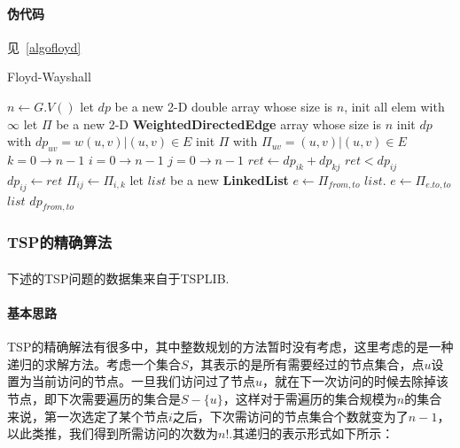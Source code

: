 \documentclass[UTF8,a4paper]{ctexart}
\begin{document}
\paragraph{伪代码}见~\ref{algofloyd}
\begin{algorithm}[htbp]
    \caption{Floyd-Wayshall}\label{algofloyd}
    \begin{algorithmic}[1] %
        \State $n\gets G.V()$
        \State let $dp$ be a new 2-D double array whose size is $n$, init all elem with $\infty$
        \State let $\Pi$ be a new 2-D \textbf{WeightedDirectedEdge} array whose size is $n$
        \State init $dp$ with $dp_{uv} = w(u,v)|(u,v)\in E$
        \State init $\Pi$ with $\Pi_{uv} = (u,v)|(u,v)\in E$
        \For $k=0\to n-1$
        \For $i=0\to n-1$
        \For $j=0\to n-1$
        \State $ret\gets dp_{ik}+dp_{kj}$
        \If $ret < dp_{ij}$
        \State $dp_{ij}\gets ret$
        \State $\Pi_{ij}\gets \Pi_{i,k}$
        \EndIf
        \EndFor
        \EndFor
        \EndFor
        \EndFunction
        \State
        \State let $list$ be a new \textbf{LinkedList}
        \State $e\gets \Pi_{from,to}$
        \State $list.$
        \State $e\gets \Pi_{e.to,to}$
        \EndWhile
        \State \Return $list$
        \EndIf
        \State {}
        \EndFunction
        \State
        \State \Return $dp_{from,to}$
        \EndFunction
    \end{algorithmic}
\end{algorithm}

\subsubsection{TSP的精确算法}
\paragraph{}下述的TSP问题的数据集来自于TSPLIB.~\cite{tsplib}
\paragraph{基本思路}TSP的精确解法有很多中，其中整数规划的方法暂时没有考虑，这里考虑的是一种递归的求解方法。考虑一个集合$S$，其表示的是所有需要经过的节点集合，点$u$设置为当前访问的节点。一旦我们访问过了节点$u$，就在下一次访问的时候去除掉该节点，即下次需要遍历的集合是$S-\{u\}$，这样对于需遍历的集合规模为$n$的集合来说，第一次选定了某个节点$i$之后，下次需访问的节点集合个数就变为了$n-1$，以此类推，我们得到所需访问的次数为$n!$.其递归的表示形式如下所示：
\[

\]
\end{document}
